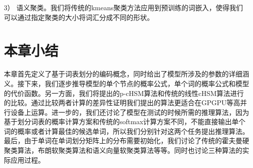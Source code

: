 3） 语义聚类。我们将传统的kmeans聚类方法应用到预训练的词嵌入，使得我们可以通过指定聚类的大小将词汇分成不同的形状。

\section{本章小结}
本章首先定义了基于词表划分的编码概念，同时给出了模型所涉及的参数的详细涵义。接下来，我们逐步推导模型的单个节点的概率公式，单个词的概率公式和模型的代价函数。另一方面，我们将提出的p-cHSM算法和传统的线性cHSM算法进行的比较。通过比较两者计算的差异性证明我们提出的算法更适合在GPGPU等高并行设备上运算。进一步的，我们还讨论了模型在测试的时候所需的推理算法，因为基于划分词表的概率计算方案和传统的softmax计算方案不同，不能直接输出单个词的概率或者计算最佳的候选单词，所以我们分别针对这两个任务提出推理算法。最后，由于单词在单词划分矩阵上的分布需要初始化，我们讨论了传统的霍夫曼硬聚类算法，布朗软聚类算法和语义向量软聚类算法等等。同时也讨论三种算法的实际应用过程。